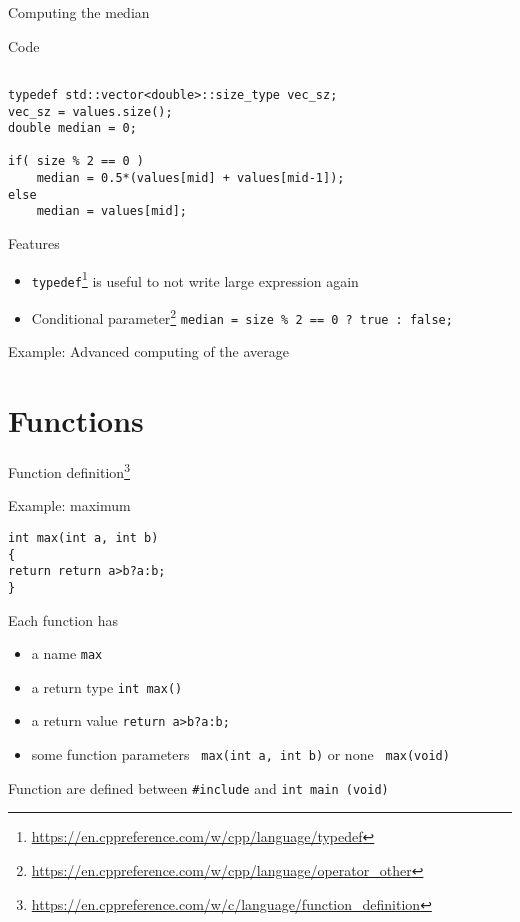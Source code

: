 \documentclass[12pt]{beamer}
\begin{document}
\begin{frame}[fragile]{Computing the median}

\begin{block}{Code}
\begin{lstlisting}

typedef std::vector<double>::size_type vec_sz;
vec_sz = values.size();
double median = 0;

if( size % 2 == 0 ) 
	median = 0.5*(values[mid] + values[mid-1]);
else
	median = values[mid];
\end{lstlisting}
\end{block}

\begin{block}{Features}
\begin{itemize}
\item \lstinline|typedef|\footnote{\tiny\url{https://en.cppreference.com/w/cpp/language/typedef}} is useful to not write large expression again
\item Conditional parameter\footnote{\tiny\url{https://en.cppreference.com/w/cpp/language/operator_other}} \lstinline|median = size % 2 == 0 ? true : false; |
\end{itemize}
\end{block}
\end{frame}

\begin{frame}{Example: Advanced computing of the average}



\end{frame}

\section{Functions}

\begin{frame}[fragile]{Function definition\footnote{\tiny\url{https://en.cppreference.com/w/c/language/function_definition}}}

\begin{block}{Example: maximum}
\begin{lstlisting}
int max(int a, int b)
{
return return a>b?a:b;
}

\end{lstlisting}
\end{block}
\begin{block}{Each function has}
\begin{itemize}
\item a name \lstinline|max|
\item a return type \lstinline|int max()|
\item a return value \lstinline|return a>b?a:b;|
\item some function parameters \lstinline| max(int a, int b)| or none \lstinline| max(void) |
\end{itemize}
\end{block}
Function are defined between \lstinline|#include| and \lstinline|int main (void)|
\end{frame}
\end{document}
